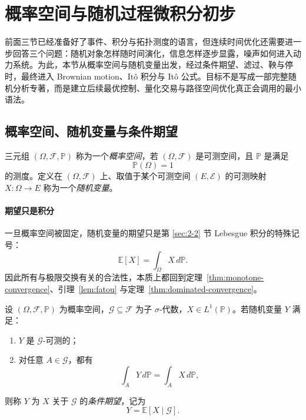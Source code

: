 \section{概率空间与随机过程微积分初步}

\label{sec:2-4}

前面三节已经准备好了事件、积分与拓扑测度的语言，但连续时间优化还需要进一步回答三个问题：随机对象怎样随时间演化，信息怎样逐步显露，噪声如何进入动力系统。为此，本节从概率空间与随机变量出发，经过条件期望、滤过、鞅与停时，最终进入 Brownian motion、Itô 积分与 Itô 公式。目标不是写成一部完整随机分析专著，而是建立后续最优控制、量化交易与路径空间优化真正会调用的最小语法。

\subsection{概率空间、随机变量与条件期望}

\begin{definition}[概率空间]\label{def:probability-space}
三元组 $(\Omega,\mathscr F,\mathbb P)$ 称为一个\emph{概率空间}，若 $(\Omega,\mathscr F)$ 是可测空间，且 $\mathbb P$ 是满足
\[
\mathbb P(\Omega)=1
\]
的测度。定义在 $(\Omega,\mathscr F)$ 上、取值于某个可测空间 $(E,\mathscr E)$ 的可测映射 $X\colon \Omega\to E$ 称为一个\emph{随机变量}。
\end{definition}

\paragraph{期望只是积分}

\begin{remark}
一旦概率空间被固定，随机变量的期望只是第 \ref{sec:2-2} 节 Lebesgue 积分的特殊记号：
\[
\mathbb E[X]=\int_\Omega X\,d\mathbb P.
\]
因此所有与极限交换有关的合法性，本质上都回到定理~\ref{thm:monotone-convergence}、引理~\ref{lem:fatou} 与定理~\ref{thm:dominated-convergence}。
\end{remark}

\begin{definition}[条件期望]\label{def:conditional-expectation}
设 $(\Omega,\mathscr F,\mathbb P)$ 为概率空间，$\mathscr G\subseteq \mathscr F$ 为子 $\sigma$-代数，$X\in L^1(\mathbb P)$。若随机变量 $Y$ 满足：
\begin{enumerate}
  \item $Y$ 是 $\mathscr G$-可测的；
  \item 对任意 $A\in \mathscr G$，都有
  \[
  \int_A Y\,d\mathbb P=\int_A X\,d\mathbb P,
  \]
\end{enumerate}
则称 $Y$ 为 $X$ 关于 $\mathscr G$ 的\emph{条件期望}，记为
\[
Y=\mathbb E[X\mid \mathscr G].
\]
\end{definition}

